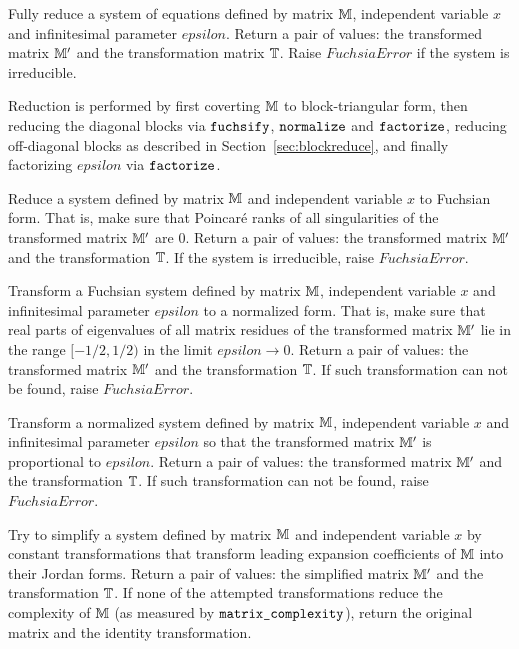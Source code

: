 \documentclass[12pt,a4paper]{article}
\begin{document}
\begin{description}[style=nextline]

Fully reduce a system of equations defined by matrix $\mathbb{M}$, independent variable $x$ and infinitesimal parameter $epsilon$.
Return a pair of values: the transformed matrix $\mathbb{M}'$ and the transformation matrix $\mathbb{T}$.
Raise $FuchsiaError$ if the system is irreducible.

Reduction is performed by first coverting $\mathbb{M}$ to block-triangular form, then reducing the diagonal blocks via $\texttt{fuchsify}$, $\texttt{normalize}$ and $\texttt{factorize}$, reducing off-diagonal blocks as described in Section~\ref{sec:blockreduce}, and finally factorizing $epsilon$ via $\texttt{factorize}$.

Reduce a system defined by matrix $\mathbb{M}$ and independent variable $x$ to Fuchsian form.
That is, make sure that Poincar\'e ranks of all singularities of the transformed matrix $\mathbb{M}'$ are $0$.
Return a pair of values: the transformed matrix $\mathbb{M}'$ and the transformation $\mathbb{T}$.
If the system is irreducible, raise $FuchsiaError$.

Transform a Fuchsian system defined by matrix $\mathbb{M}$, independent variable $x$ and infinitesimal parameter $epsilon$ to a normalized form.
That is, make sure that real parts of eigenvalues of all matrix residues of the transformed matrix $\mathbb{M}'$ lie in the range $[-1/2, 1/2)$ in the limit $epsilon\to0$.
Return a pair of values: the transformed matrix $\mathbb{M}'$ and the transformation $\mathbb{T}$.
If such transformation can not be found, raise $FuchsiaError$.

Transform a normalized system defined by matrix $\mathbb{M}$, independent variable $x$ and infinitesimal parameter $epsilon$ so that the
transformed matrix $\mathbb{M}'$ is proportional to $epsilon$.
Return a pair of values: the transformed matrix $\mathbb{M}'$ and the transformation $\mathbb{T}$.
If such transformation can not be found, raise $FuchsiaError$.

Try to simplify a system defined by matrix $\mathbb{M}$ and independent variable $x$ by constant transformations that transform leading expansion coefficients of $\mathbb{M}$ into their Jordan forms.
Return a pair of values: the simplified matrix $\mathbb{M}'$ and the transformation $\mathbb{T}$.
If none of the attempted transformations reduce the complexity of $\mathbb{M}$ (as measured by $\texttt{matrix\_complexity}$), return the original matrix and the identity transformation.


\end{description}
\end{document}
